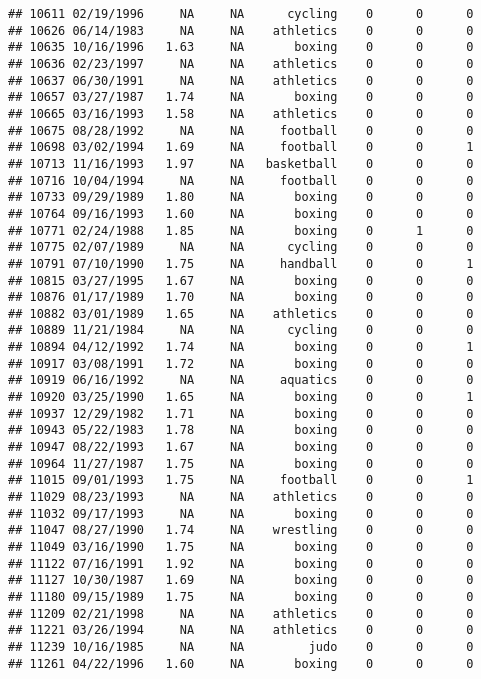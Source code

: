 \documentclass[]{article}
\begin{document}
\begin{verbatim}
## 10611 02/19/1996     NA     NA      cycling    0      0      0
## 10626 06/14/1983     NA     NA    athletics    0      0      0
## 10635 10/16/1996   1.63     NA       boxing    0      0      0
## 10636 02/23/1997     NA     NA    athletics    0      0      0
## 10637 06/30/1991     NA     NA    athletics    0      0      0
## 10657 03/27/1987   1.74     NA       boxing    0      0      0
## 10665 03/16/1993   1.58     NA    athletics    0      0      0
## 10675 08/28/1992     NA     NA     football    0      0      0
## 10698 03/02/1994   1.69     NA     football    0      0      1
## 10713 11/16/1993   1.97     NA   basketball    0      0      0
## 10716 10/04/1994     NA     NA     football    0      0      0
## 10733 09/29/1989   1.80     NA       boxing    0      0      0
## 10764 09/16/1993   1.60     NA       boxing    0      0      0
## 10771 02/24/1988   1.85     NA       boxing    0      1      0
## 10775 02/07/1989     NA     NA      cycling    0      0      0
## 10791 07/10/1990   1.75     NA     handball    0      0      1
## 10815 03/27/1995   1.67     NA       boxing    0      0      0
## 10876 01/17/1989   1.70     NA       boxing    0      0      0
## 10882 03/01/1989   1.65     NA    athletics    0      0      0
## 10889 11/21/1984     NA     NA      cycling    0      0      0
## 10894 04/12/1992   1.74     NA       boxing    0      0      1
## 10917 03/08/1991   1.72     NA       boxing    0      0      0
## 10919 06/16/1992     NA     NA     aquatics    0      0      0
## 10920 03/25/1990   1.65     NA       boxing    0      0      1
## 10937 12/29/1982   1.71     NA       boxing    0      0      0
## 10943 05/22/1983   1.78     NA       boxing    0      0      0
## 10947 08/22/1993   1.67     NA       boxing    0      0      0
## 10964 11/27/1987   1.75     NA       boxing    0      0      0
## 11015 09/01/1993   1.75     NA     football    0      0      1
## 11029 08/23/1993     NA     NA    athletics    0      0      0
## 11032 09/17/1993     NA     NA       boxing    0      0      0
## 11047 08/27/1990   1.74     NA    wrestling    0      0      0
## 11049 03/16/1990   1.75     NA       boxing    0      0      0
## 11122 07/16/1991   1.92     NA       boxing    0      0      0
## 11127 10/30/1987   1.69     NA       boxing    0      0      0
## 11180 09/15/1989   1.75     NA       boxing    0      0      0
## 11209 02/21/1998     NA     NA    athletics    0      0      0
## 11221 03/26/1994     NA     NA    athletics    0      0      0
## 11239 10/16/1985     NA     NA         judo    0      0      0
## 11261 04/22/1996   1.60     NA       boxing    0      0      0

\end{verbatim}
\end{document}
